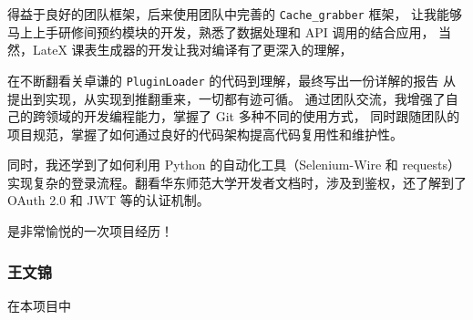\documentclass[14pt,a4paper,UTF8,twoside]{article}
\begin{document}
\begin{Thought}
得益于良好的团队框架，后来使用团队中完善的 \texttt{Cache\_grabber} 框架，
让我能够马上上手研修间预约模块的开发，熟悉了数据处理和 API 调用的结合应用，
当然，LateX 课表生成器的开发让我对编译有了更深入的理解，

\vspace{0.3cm}

在不断翻看关卓谦的 \texttt{PluginLoader} 的代码到理解，最终写出一份详解的报告
从提出到实现，从实现到推翻重来，一切都有迹可循。
通过团队交流，我增强了自己的跨领域的开发编程能力，掌握了 Git 多种不同的使用方式，
同时跟随团队的项目规范，掌握了如何通过良好的代码架构提高代码复用性和维护性。

\vspace{0.3cm}

同时，我还学到了如何利用 Python 的自动化工具（Selenium-Wire 和 requests）
实现复杂的登录流程。翻看华东师范大学开发者文档时，涉及到鉴权，还了解到了 OAuth 2.0 和 JWT 等的认证机制。

\vspace{0.3cm}

是非常愉悦的一次项目经历！
\end{Thought}

\subsubsection*{王文锦}

\begin{Thought}
在本项目中
\end{Thought}
\end{document}
